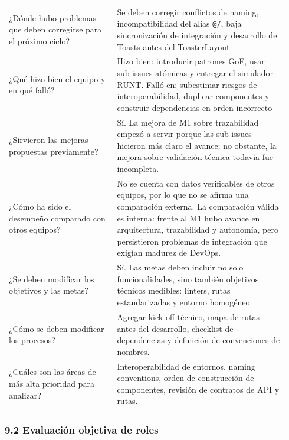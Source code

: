 \documentclass[11pt,a4paper]{article}
\begin{document}
\begin{longtable}{P{0.36\linewidth}P{0.58\linewidth}}
¿Dónde hubo problemas que deben corregirse para el próximo ciclo? & Se deben corregir conflictos de naming, incompatibilidad del alias \texttt{@/}, baja sincronización de integración y desarrollo de Toasts antes del ToasterLayout. \\
¿Qué hizo bien el equipo y en qué falló? & Hizo bien: introducir patrones GoF, usar sub-issues atómicas y entregar el simulador RUNT. Falló en: subestimar riesgos de interoperabilidad, duplicar componentes y construir dependencias en orden incorrecto \\
¿Sirvieron las mejoras propuestas previamente? & Sí. La mejora de M1 sobre trazabilidad empezó a servir porque las sub-issues hicieron más claro el avance; no obstante, la mejora sobre validación técnica todavía fue incompleta. \\
¿Cómo ha sido el desempeño comparado con otros equipos? & No se cuenta con datos verificables de otros equipos, por lo que no se afirma una comparación externa. La comparación válida es interna: frente al M1 hubo avance en arquitectura, trazabilidad y autonomía, pero persistieron problemas de integración que exigían madurez de DevOps. \\
¿Se deben modificar los objetivos y las metas? & Sí. Las metas deben incluir no solo funcionalidades, sino también objetivos técnicos medibles: linters, rutas estandarizadas y entorno homogéneo. \\
¿Cómo se deben modificar los procesos? & Agregar kick-off técnico, mapa de rutas antes del desarrollo, checklist de dependencias y definición de convenciones de nombres. \\
¿Cuáles son las áreas de más alta prioridad para analizar? & Interoperabilidad de entornos, naming conventions, orden de construcción de componentes, revisión de contratos de API y rutas. \\
\end{longtable}
\endgroup

\subsubsection{9.2 Evaluación objetiva de roles}
\end{document}
